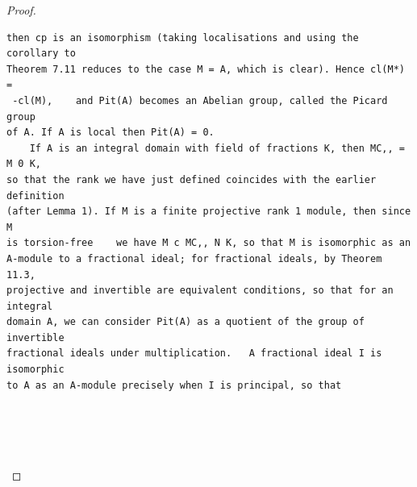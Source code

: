 \begin{proof}
\begin{verbatim}
then cp is an isomorphism (taking localisations and using the corollary to
Theorem 7.11 reduces to the case M = A, which is clear). Hence cl(M*) =
 -cl(M),    and Pit(A) becomes an Abelian group, called the Picard group
of A. If A is local then Pit(A) = 0.
    If A is an integral domain with field of fractions K, then MC,, = M 0 K,
so that the rank we have just defined coincides with the earlier definition
(after Lemma 1). If M is a finite projective rank 1 module, then since M
is torsion-free    we have M c MC,, N K, so that M is isomorphic as an
A-module to a fractional ideal; for fractional ideals, by Theorem 11.3,
projective and invertible are equivalent conditions, so that for an integral
domain A, we can consider Pit(A) as a quotient of the group of invertible
fractional ideals under multiplication.   A fractional ideal I is isomorphic
to A as an A-module precisely when I is principal, so that





\end{verbatim}
\end{proof}
